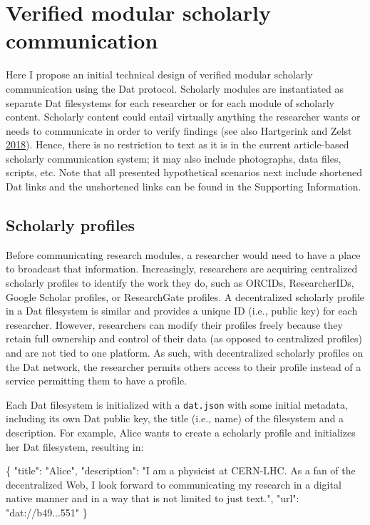 \documentclass[a5paper]{book}
\newenvironment{Shaded}{\begin{snugshade}}{\end{snugshade}}
\newcommand{\DataTypeTok}[1]{\textcolor[rgb]{0.13,0.29,0.53}{#1}}
\newcommand{\StringTok}[1]{\textcolor[rgb]{0.31,0.60,0.02}{#1}}
\newcommand{\FunctionTok}[1]{\textcolor[rgb]{0.00,0.00,0.00}{#1}}
\begin{document}
\section{Verified modular scholarly
communication}\label{verified-modular-scholarly-communication}

Here I propose an initial technical design of verified modular scholarly
communication using the Dat protocol. Scholarly modules are instantiated
as separate Dat filesystems for each researcher or for each module of
scholarly content. Scholarly content could entail virtually anything the
researcher wants or needs to communicate in order to verify findings
(see also Hartgerink and Zelst
\protect\hyperlink{ref-doi:10.3390ux2fpublications6020021}{2018}).
Hence, there is no restriction to text as it is in the current
article-based scholarly communication system; it may also include
photographs, data files, scripts, etc. Note that all presented
hypothetical scenarios next include shortened Dat links and the
unshortened links can be found in the Supporting Information.

\subsection{Scholarly profiles}\label{scholarly-profiles}

Before communicating research modules, a researcher would need to have a
place to broadcast that information. Increasingly, researchers are
acquiring centralized scholarly profiles to identify the work they do,
such as ORCIDs, ResearcherIDs, Google Scholar profiles, or ResearchGate
profiles. A decentralized scholarly profile in a Dat filesystem is
similar and provides a unique ID (i.e., public key) for each researcher.
However, researchers can modify their profiles freely because they
retain full ownership and control of their data (as opposed to
centralized profiles) and are not tied to one platform. As such, with
decentralized scholarly profiles on the Dat network, the researcher
permits others access to their profile instead of a service permitting
them to have a profile.

Each Dat filesystem is initialized with a \texttt{dat.json} with some
initial metadata, including its own Dat public key, the title (i.e.,
name) of the filesystem and a description. For example, Alice wants to
create a scholarly profile and initializes her Dat filesystem, resulting
in:

\begin{Shaded}
\begin{Highlighting}[]
\FunctionTok{\{}
  \DataTypeTok{"title"}\FunctionTok{:} \StringTok{"Alice"}\FunctionTok{,}
  \DataTypeTok{"description"}\FunctionTok{:} \StringTok{"I am a physicist at CERN-LHC. As a fan of the }
\StringTok{    decentralized Web, I look forward to communicating my research}
\StringTok{    in a digital native manner and in a way that is not limited }
\StringTok{    to just text."}\FunctionTok{,}
  \DataTypeTok{"url"}\FunctionTok{:} \StringTok{"dat://b49...551"}
\FunctionTok{\}}
\end{Highlighting}
\end{Shaded}
\end{document}
